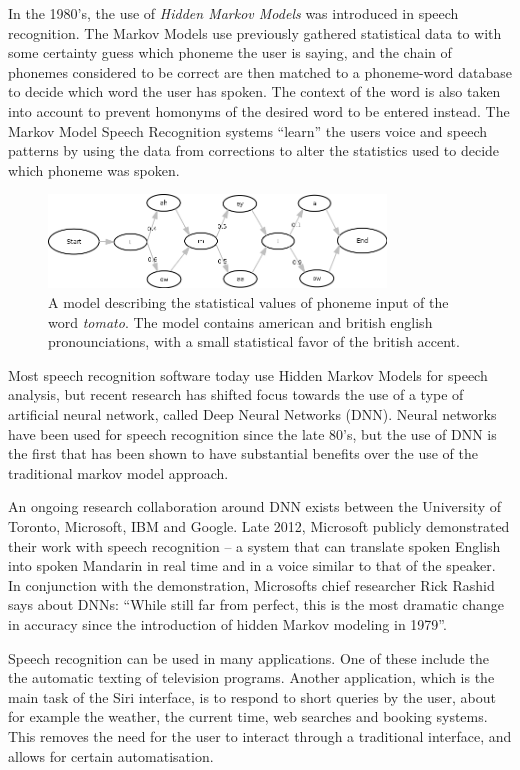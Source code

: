 In the 1980's, the use of \emph{Hidden Markov Models} was introduced in speech recognition\cite{rabiner1986introduction}. The Markov Models use previously gathered statistical data to with some certainty guess which phoneme the user is saying, and the chain of phonemes considered to be correct are then matched to a phoneme-word database to decide which word the user has spoken. The context of the word is also taken into account to prevent homonyms of the desired word to be entered instead. The Markov Model Speech Recognition systems ``learn'' the users voice and speech patterns by using the data from corrections to alter the statistics used to decide which phoneme was spoken.

\begin{figure}[]
\includegraphics[width=0.8\textwidth] {bilder/tomato.jpg}
\caption{A model describing the statistical values of phoneme input of the word \emph{tomato}. The model contains american and british english pronounciations, with a small statistical favor of the british accent.}
\label{ibooks}
\end{figure}

Most speech recognition software today use Hidden Markov Models for speech analysis\cite{DNN}, but recent research has shifted focus towards the use of a type of artificial neural network, called Deep Neural Networks (DNN). Neural networks have been used for speech recognition since the late 80's\cite{waibel:phoneme}, but the use of DNN is the first that has been shown to have substantial benefits over the use of the traditional markov model approach.

An ongoing research collaboration around DNN exists between the University of Toronto, Microsoft, IBM and Google. Late 2012, Microsoft publicly demonstrated their work with speech recognition -- a system that can translate spoken English into spoken Mandarin in real time and in a voice similar to that of the speaker. In conjunction with the demonstration, Microsofts chief researcher Rick Rashid says about DNNs: ``While still far from perfect, this is the most dramatic change in accuracy since the introduction of hidden Markov modeling in 1979''\cite{chin}.

Speech recognition can be used in many applications. One of these include the the automatic texting of television programs. Another application, which is the main task of the Siri interface, is to respond to short queries by the user, about for example the weather, the current time, web searches and booking systems. This removes the need for the user to interact through a traditional interface, and allows for certain automatisation.